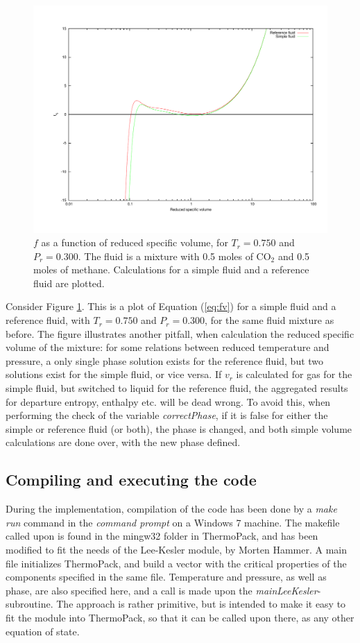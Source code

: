 \documentclass[internal,english]{sintefmemo2012}
\numberwithin{equation}{section}
\newcommand*{\reff}[1]{(\ref{#1})}
\begin{document}
\begin{figure}
	\centering
	\includegraphics[trim = 1.5cm 2cm 0 1cm, clip = true, width=14cm]{075Tc_SR}
	\caption{$f$ as a function of reduced specific volume, for $T_r = 0.750$ and $P_r = 0.300$. The fluid is a mixture with 0.5 moles of CO$_2$ and 0.5 moles of methane. Calculations for a simple fluid and a reference fluid are plotted.}
	\label{fig:vrSimpRef}
\end{figure}

Consider Figure \ref{fig:vrSimpRef}. This is a plot of Equation \reff{eq:fv} for a simple fluid and a reference fluid, with $T_r = 0.750$ and $P_r = 0.300$, for the same fluid mixture as before. The figure illustrates another pitfall, when calculation the reduced specific volume of the mixture: for some relations between reduced temperature and pressure, a only single phase solution exists for the reference fluid, but two solutions exist for the simple fluid, or vice versa. If $v_r$ is calculated for gas for the simple fluid, but switched to liquid for the reference fluid, the aggregated results for departure entropy, enthalpy etc. will be dead wrong. To avoid this, when performing the check of the variable \textit{correctPhase}, if it is false for either the simple or reference fluid (or both), the phase is changed, and both simple volume calculations are done over, with the new phase defined.

\subsection{Compiling and executing the code}
During the implementation, compilation of the code has been done by a \textit{make run} command in the \textit{command prompt} on a Windows 7 machine. The makefile called upon is found in the mingw32 folder in ThermoPack, and has been modified to fit the needs of the Lee-Kesler module, by Morten Hammer. A main file initializes ThermoPack, and build a vector with the critical properties of the components specified in the same file. Temperature and pressure, as well as phase, are also specified here, and a call is made upon the \textit{mainLeeKesler}-subroutine. The approach is rather primitive, but is intended to make it easy to fit the module into ThermoPack, so that it can be called upon there, as any other equation of state. 
\end{document}
